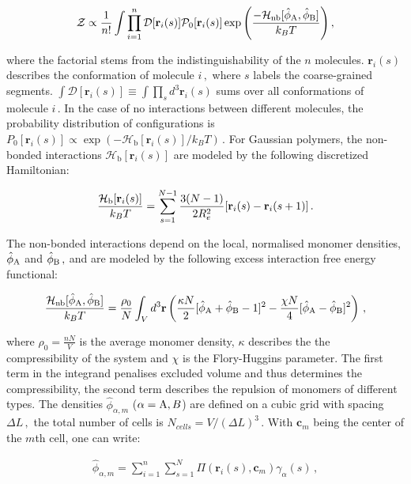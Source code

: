 \documentclass[bachelor,       %
               twoside,        %
               BCOR10mm,       %
               ngerman, english %
               ]{GAUBM}
\begin{document}
\begin{align}
    \mathcal{Z}\propto\frac{1}{n!}\int{\prod_{i=1}^n\mathcal{D}[\mathbf r_i(s)]\mathcal P_0[\mathbf r_i(s)]\exp\left(\frac{-\mathcal H_{\text{nb}}[\hat\phi_\text A,\hat\phi_\text B]}{k_BT}\right)}\,,
\end{align}

where the factorial stems from the indistinguishability of the $n$ molecules. $\mathbf r_i(s)$ describes the conformation of molecule $i\,,$ where $s$ labels the coarse-grained segments. $\int\mathcal{D}[\mathbf r_i(s)]\equiv \int\prod_sd^3\mathbf r_i(s)$ sums over all conformations of molecule $i\,.$ In the case of no interactions between different molecules, the probability distribution of configurations is $P_0[\mathbf r_i(s)]\propto\exp\left(-\mathcal H_{\text{b}}[\mathbf r_i(s)]/k_BT\right)\,.$ For Gaussian polymers, the non-bonded interactions $\mathcal H_{\text{b}}[\mathbf r_i(s)]$ are modeled by the following discretized Hamiltonian:

\begin{align}
    \frac{\mathcal H_\text b[\mathbf r_i(s)]}{k_BT}=\sum_{s=1}^{N-1}\frac{3(N-1)}{2R_e^2}[\mathbf r_i(s)-\mathbf r_i(s+1)]\,.
\end{align}

The non-bonded interactions depend on the local, normalised monomer densities, $\hat\phi_\text A$ and $\hat\phi_\text B\,,$ and are modeled by the following excess interaction free energy functional:

\begin{align}
    \frac{\mathcal H_\text{nb}[\hat\phi_\text A,\hat\phi_\text B]}{k_BT}=\frac{\rho_0}{N}\int_Vd^3\mathbf r\left(\frac{\kappa N}{2}[\hat\phi_\text A+\hat\phi_\text B-1]^2-\frac{\chi N}{4}[\hat\phi_\text A-\hat\phi_\text B]^2\right)\,,
    \label{eq:nonbonded}
\end{align}

where $\rho_0=\frac{nN}{V}$ is the average monomer density, $\kappa$ describes the the compressibility of the system and $\chi$ is the Flory-Huggins parameter. The first term in the integrand penalises excluded volume and thus determines the compressibility, the second term describes the repulsion of monomers of different types. The densities $\hat\phi_{\alpha,m}$ ($\alpha=\text A,B$) are defined on a cubic grid with spacing $\Delta L\,,$ the total number of cells is $N_{cells}=V/(\Delta L)^3\,.$ With $\mathbf c_m$ being the center of the $m$th cell, one can write:

\begin{align}
    \hat\phi_{\alpha,m}=\sum_{i=1}^n\sum_{s=1}^N\Pi(\mathbf r_i(s),\mathbf c_m)\gamma_\alpha(s)\,,
\end{align}
\end{document}
